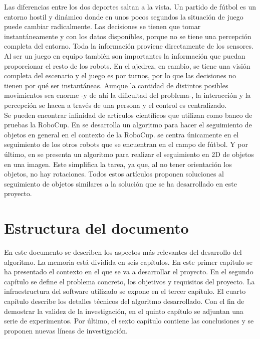 Las diferencias entre los dos deportes saltan a la vista. Un partido de fútbol es un entorno hostil y dinámico donde en unos pocos segundos la situación de juego puede cambiar radicalmente. Las decisiones se tienen que tomar instantáneamente y con los datos disponibles, porque no se tiene una percepción completa del entorno. Toda la información proviene directamente de los sensores. Al ser un juego en equipo también son importantes la información que puedan proporcionar el resto de los robots. En el ajedrez, en cambio, se tiene una visión completa del escenario y el juego es por turnos, por lo que las decisiones no tienen por qué ser instantáneas. Aunque la cantidad de distintos posibles movimientos sea enorme -y de ahí la dificultad del problema-, la interacción y la percepción se hacen a través de una persona y el control es centralizado. \\

Se pueden encontrar infinidad de artículos científicos que utilizan como banco de pruebas la RoboCup. En \cite{MultiObjectsManuela} se desarrolla un algoritmo para hacer el seguimiento de objetos en general en el contexto de la RoboCup. \cite{RobotRecognition} se centra únicamente en el seguimiento de los otros robots que se encuentran en el campo de fútbol. Y por último, en \cite{MultiHypothesis} se presenta un algoritmo para realizar el seguimiento en 2D de objetos en una imagen. Este simplifica la tarea, ya que, al no tener orientación los objetos, no hay rotaciones. Todos estos artículos proponen soluciones al seguimiento de objetos similares a la solución que se ha desarrollado en este proyecto. \\

\section{Estructura del documento}
\label{sec:estructuradeldocumento}

En este documento se describen los aspectos más relevantes del desarrollo del algoritmo. La memoria está dividida en seis capítulos. En este primer capítulo se ha presentado el contexto en el que se va a desarrollar el proyecto. En el segundo capítulo se define el problema concreto, los objetivos y requisitos del proyecto. La infraestructura del software utilizado se expone en el tercer capítulo. El cuarto capítulo describe los detalles técnicos del algoritmo desarrollado. Con el fin de demostrar la validez de la investigación, en el quinto capítulo se adjuntan una serie de experimentos. Por último, el sexto capítulo contiene las conclusiones y se proponen nuevas líneas de investigación.\\

